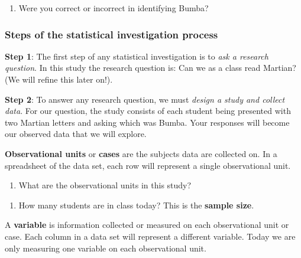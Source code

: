 \documentclass[
]{report}
\providecommand{\tightlist}{%
  \setlength{\itemsep}{0pt}\setlength{\parskip}{0pt}}
\begin{document}
\begin{enumerate}
\def\labelenumi{\arabic{enumi}.}
\tightlist
\item
  Were you correct or incorrect in identifying Bumba?
\end{enumerate}

\vspace{1mm}

\hypertarget{steps-of-the-statistical-investigation-process}{%
\subsubsection*{Steps of the statistical investigation process}\label{steps-of-the-statistical-investigation-process}}

\textbf{Step 1}: The first step of any statistical investigation is to \emph{ask a research question}. In this study the research question is: Can we as a class read Martian? (We will refine this later on!).

\textbf{Step 2}: To answer any research question, we must \emph{design a study and collect data}. For our question, the study consists of each student being presented with two Martian letters and asking which was Bumba. Your responses will become our observed data that we will explore.

\textbf{Observational units} or \textbf{cases} are the subjects data are collected on. In a spreadsheet of the data set, each row will represent a single observational unit.

\begin{enumerate}
\def\labelenumi{\arabic{enumi}.}
\setcounter{enumi}{1}
\tightlist
\item
  What are the observational units in this study?
\end{enumerate}

\vspace{0.2in}

\begin{enumerate}
\def\labelenumi{\arabic{enumi}.}
\setcounter{enumi}{2}
\tightlist
\item
  How many students are in class today? This is the \textbf{sample size}.
\end{enumerate}

\vspace{0.2in}

A \textbf{variable} is information collected or measured on each observational unit or case. Each column in a data set will represent a different variable. Today we are only measuring one variable on each observational unit.
\end{document}
